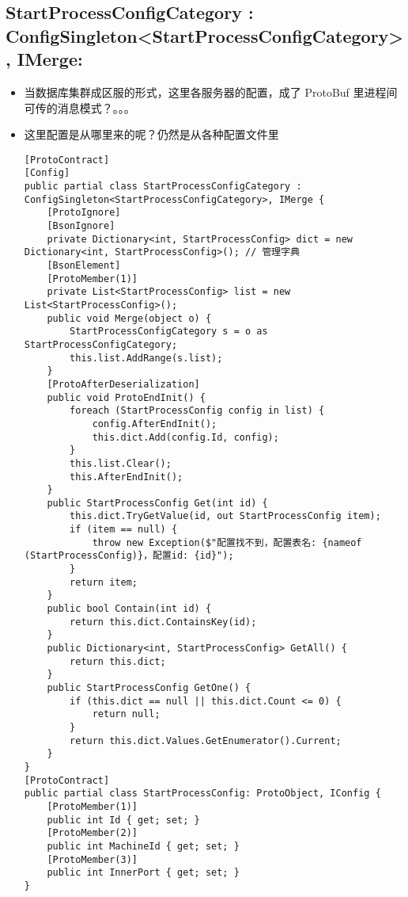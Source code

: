 \documentclass[9pt, b5paper]{article}
\begin{document}
\subsection{StartProcessConfigCategory : ConfigSingleton<StartProcessConfigCategory>, IMerge:}
\label{sec-7-2}
\begin{itemize}
\item 当数据库集群成区服的形式，这里各服务器的配置，成了 ProtoBuf 里进程间可传的消息模式？。。。
\item 这里配置是从哪里来的呢？仍然是从各种配置文件里
\begin{verbatim}
[ProtoContract]
[Config]
public partial class StartProcessConfigCategory : ConfigSingleton<StartProcessConfigCategory>, IMerge {
    [ProtoIgnore]
    [BsonIgnore]
    private Dictionary<int, StartProcessConfig> dict = new Dictionary<int, StartProcessConfig>(); // 管理字典
    [BsonElement]
    [ProtoMember(1)]
    private List<StartProcessConfig> list = new List<StartProcessConfig>();
    public void Merge(object o) {
        StartProcessConfigCategory s = o as StartProcessConfigCategory;
        this.list.AddRange(s.list);
    }
    [ProtoAfterDeserialization]        
    public void ProtoEndInit() {
        foreach (StartProcessConfig config in list) {
            config.AfterEndInit();
            this.dict.Add(config.Id, config);
        }
        this.list.Clear();
        this.AfterEndInit();
    }
    public StartProcessConfig Get(int id) {
        this.dict.TryGetValue(id, out StartProcessConfig item);
        if (item == null) {
            throw new Exception($"配置找不到，配置表名: {nameof (StartProcessConfig)}，配置id: {id}");
        }
        return item;
    }
    public bool Contain(int id) {
        return this.dict.ContainsKey(id);
    }
    public Dictionary<int, StartProcessConfig> GetAll() {
        return this.dict;
    }
    public StartProcessConfig GetOne() {
        if (this.dict == null || this.dict.Count <= 0) {
            return null;
        }
        return this.dict.Values.GetEnumerator().Current;
    }
}
[ProtoContract]
public partial class StartProcessConfig: ProtoObject, IConfig {
    [ProtoMember(1)]
    public int Id { get; set; }
    [ProtoMember(2)]
    public int MachineId { get; set; }
    [ProtoMember(3)]
    public int InnerPort { get; set; }
}
\end{verbatim}
\end{itemize}
\end{document}
